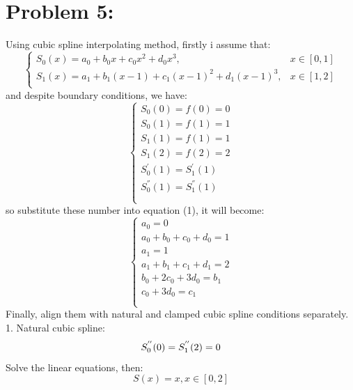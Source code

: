 \documentclass{article}
\begin{document}
\section{Problem 5:}
Using cubic spline interpolating method, firstly i assume that:
\begin{equation}
\left\{  
\begin{array}{lr}
    S_0(x)=a_0+b_0x+c_0x^2+d_0x^3, & x \in [0,1] \\
    S_1(x)=a_1+b_1(x-1)+c_1(x-1)^2+d_1(x-1)^3, & x \in [1,2] \\
\end{array}
\right.
\end{equation}
and despite boundary conditions, we have: \\
\begin{equation}
\left\{  
\begin{array}{lr}
    S_0(0)=f(0)=0 \\
    S_0(1)=f(1)=1 \\
    S_1(1)=f(1)=1 \\
    S_1(2)=f(2)=2 \\
    S_0^{'}(1)=S_1^{'}(1) \\
    S_0^{''}(1)=S_1^{''}(1) \\
    \nonumber \\
\end{array}
\right.
\end{equation}
so substitute these number into equation (1), it will become: \\
\begin{equation}
\left\{  
\begin{array}{lr}
    a_0=0 \\
    a_0+b_0+c_0+d_0=1 \\
    a_1=1 \\
    a_1+b_1+c_1+d_1=2 \\
    b_0+2c_0+3d_0=b_1 \\
    c_0+3d_0=c_1 \\
    \nonumber \\
\end{array}
\right.
\end{equation}
Finally, align them with natural and clamped cubic spline conditions separately. \\
1. Natural cubic spline:
\begin{equation}
    S_0^{''}(0)=S_1^{''}(2)=0 \\
    \nonumber \\
\end{equation}
Solve the linear equations, then:
\begin{equation}
    S(x)=x, x \in [0,2] \nonumber
\end{equation}
\end{document}
